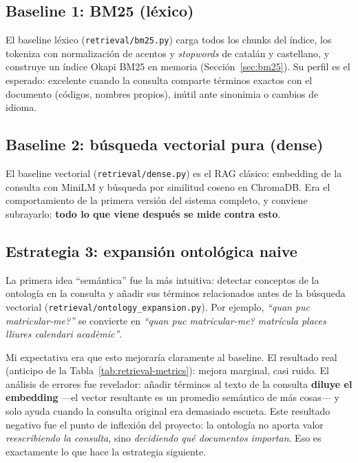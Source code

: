 \documentclass[12pt, a4paper, twoside]{report}
\begin{document}
\subsection{Baseline 1: BM25 (l\'exico)}

El baseline l\'exico (\texttt{retrieval/bm25.py}) carga todos los chunks del \'indice, los tokeniza con normalizaci\'on de acentos y \textit{stopwords} de catal\'an y castellano, y construye un \'indice Okapi BM25 en memoria (Secci\'on~\ref{sec:bm25}). Su perfil es el esperado: excelente cuando la consulta comparte t\'erminos exactos con el documento (c\'odigos, nombres propios), in\'util ante sinonimia o cambios de idioma.

\subsection{Baseline 2: b\'usqueda vectorial pura (dense)}

El baseline vectorial (\texttt{retrieval/dense.py}) es el RAG cl\'asico: embedding de la consulta con MiniLM y b\'usqueda por similitud coseno en ChromaDB. Era el comportamiento de la primera versi\'on del sistema completo, y conviene subrayarlo: \textbf{todo lo que viene despu\'es se mide contra esto}.

\subsection{Estrategia 3: expansi\'on ontol\'ogica naive}
\label{sec:ontology-naive}

La primera idea ``sem\'antica'' fue la m\'as intuitiva: detectar conceptos de la ontolog\'ia en la consulta y a\~nadir sus t\'erminos relacionados antes de la b\'usqueda vectorial (\texttt{retrieval/ontology\_expansion.py}). Por ejemplo, \textit{``quan puc matricular-me?''} se convierte en \textit{``quan puc matricular-me? matr\'icula places lliures calendari acad\`emic''}.

Mi expectativa era que esto mejorar\'ia claramente al baseline. El resultado real (anticipo de la Tabla~\ref{tab:retrieval-metrics}): mejora marginal, casi ruido. El an\'alisis de errores fue revelador: a\~nadir t\'erminos al texto de la consulta \textbf{diluye el embedding} ---el vector resultante es un promedio sem\'antico de m\'as cosas--- y solo ayuda cuando la consulta original era demasiado escueta. Este resultado negativo fue el punto de inflexi\'on del proyecto: la ontolog\'ia no aporta valor \textit{reescribiendo la consulta}, sino \textit{decidiendo qu\'e documentos importan}. Eso es exactamente lo que hace la estrategia siguiente.
\end{document}
